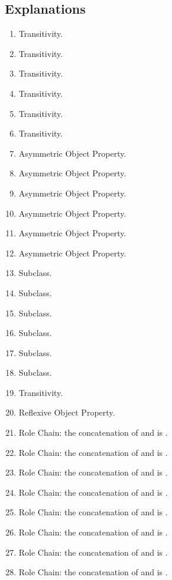 \subsection{Explanations}
\label{exp:Partonymy}
\begin{enumerate}
\item Transitivity.
\item Transitivity.
\item Transitivity.
\item Transitivity.
\item Transitivity.
\item Transitivity.
\item Asymmetric Object Property.
\item Asymmetric Object Property.
\item Asymmetric Object Property.
\item Asymmetric Object Property.
\item Asymmetric Object Property.
\item Asymmetric Object Property.
\item Subclass.
\item Subclass.
\item Subclass.
\item Subclass.
\item Subclass.
\item Subclass.
\item Transitivity.
\item Reflexive Object Property.
\item Role Chain: the concatenation of \poComObj{} and \spatialLocIn{} is \spatialLocIn{}.
\item Role Chain: the concatenation of \spatialLocIn{} and \poComObj{} is \spatialLocIn{}.
\item Role Chain: the concatenation of \poMemCol{} and \spatialLocIn{} is \spatialLocIn{}.
\item Role Chain: the concatenation of \spatialLocIn{} and \poMemCol{} is \spatialLocIn{}.
\item Role Chain: the concatenation of \poPorMas{} and \spatialLocIn{} is \spatialLocIn{}.
\item Role Chain: the concatenation of \spatialLocIn{} and \poPorMas{} is \spatialLocIn{}.
\item Role Chain: the concatenation of \poStuObj{} and \spatialLocIn{} is \spatialLocIn{}.
\item Role Chain: the concatenation of \spatialLocIn{} and \poStuObj{} is \spatialLocIn{}.

\end{enumerate}
